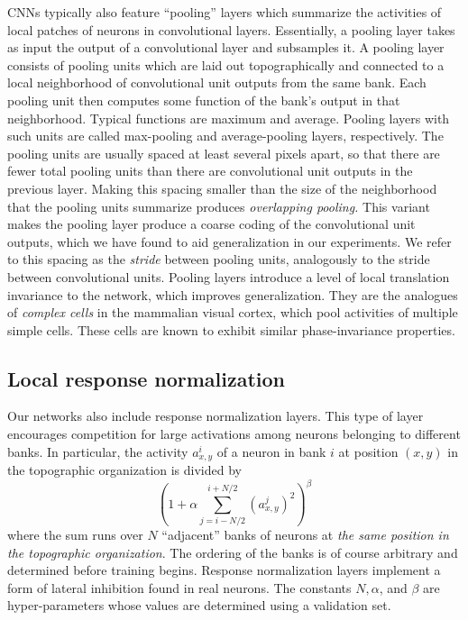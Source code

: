 \documentclass[12pt]{article}
\begin{document}
CNNs typically also feature {}``pooling'' layers which summarize
the activities of local patches of neurons in convolutional layers.
Essentially, a pooling layer takes as input the output of a convolutional
layer and subsamples it. A pooling layer consists of pooling units
which are laid out topographically and connected to a local neighborhood
of convolutional unit outputs from the same bank. Each pooling unit
then computes some function of the bank's output in that neighborhood.
Typical functions are maximum and average. Pooling layers with such
units are called max-pooling and average-pooling layers, respectively.
The pooling units are usually spaced at least several pixels apart,
so that there are fewer total pooling units than there are convolutional
unit outputs in the previous layer. Making this spacing smaller than
the size of the neighborhood that the pooling units summarize produces
\emph{overlapping pooling.} This variant makes the pooling
layer produce a coarse coding of the convolutional unit outputs, which
we have found to aid generalization in our experiments. We refer to
this spacing as the \emph{stride} between pooling units, analogously
to the stride between convolutional units. Pooling layers introduce
a level of local translation invariance to the network, which improves
generalization. They are the analogues of \emph{complex cells} in
the mammalian visual cortex, which pool activities of multiple simple
cells. These cells are known to exhibit similar phase-invariance properties.


\subsection{Local response normalization}

Our networks also include response normalization layers. This type
of layer encourages competition for large activations among neurons
belonging to different banks. In particular, the activity $a_{x,y}^{i}$
of a neuron in bank $i$ at position $(x,y)$ in the topographic organization
is divided by 
\[
\left(1+\alpha\sum_{j=i-N/2}^{i+N/2}(a_{x,y}^{j})^{2}\right)^{\beta}
\]
where the sum runs over $N$ {}``adjacent'' banks of neurons at
\emph{the same position in the topographic organization}. The
ordering of the banks is of course arbitrary and determined before
training begins. Response normalization layers implement a form of
lateral inhibition found in real neurons. The constants $N,\alpha$,
and $\beta$ are hyper-parameters whose values are determined using
a validation set.
\end{document}
